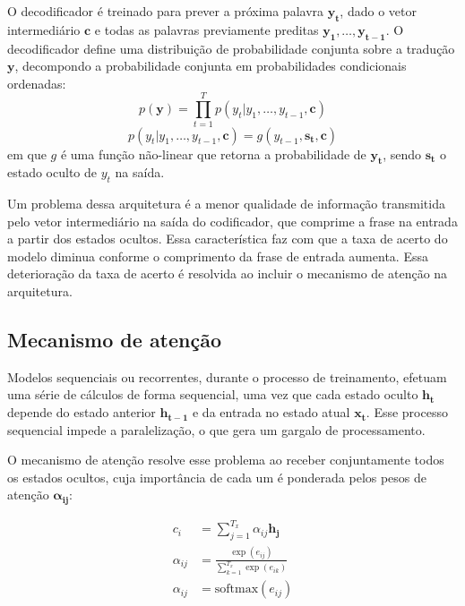 O decodificador é treinado para prever a próxima palavra $\mathbf{y_t}$, dado o
vetor intermediário $\mathbf{c}$ e todas as palavras previamente preditas
$\mathbf{y_1}, \ldots, \mathbf{y_{t-1}}$. O decodificador define uma
distribuição de probabilidade conjunta sobre a tradução $\mathbf{y}$, decompondo
a probabilidade conjunta em probabilidades condicionais ordenadas:
\begin{equation}
    p(\mathbf{y}) = \prod_{t=1}^T p(y_t | y_1, \ldots, y_{t-1}, \mathbf{c})
\end{equation}
\begin{equation}
    p(y_t | y_1, \ldots, y_{t-1}, \mathbf{c}) = g(y_{t-1}, \mathbf{s_t}, \mathbf{c})
\end{equation}
em que $g$ é uma função não-linear que retorna a probabilidade de
$\mathbf{y_t}$, sendo $\mathbf{s_t}$ o estado oculto de $y_t$ na saída.

Um problema dessa arquitetura é a menor qualidade de informação transmitida pelo
vetor intermediário na saída do codificador, que comprime a frase na entrada a
partir dos estados ocultos. Essa característica faz com que a taxa de acerto do
modelo diminua conforme o comprimento da frase de entrada aumenta. Essa
deterioração da taxa de acerto é resolvida ao incluir o mecanismo de atenção
na arquitetura.

\subsection{Mecanismo de atenção}
Modelos sequenciais ou recorrentes, durante o processo de treinamento, efetuam
uma série de cálculos de forma sequencial, uma vez que cada estado oculto
$\mathbf{h_t}$ depende do estado anterior $\mathbf{h_{t-1}}$ e da entrada no
estado atual $\mathbf{x_t}$. Esse processo sequencial impede a paralelização, o
que gera um gargalo de processamento.

O mecanismo de atenção \cite{bahdanau2016neural} resolve esse problema ao
receber conjuntamente todos os estados ocultos, cuja importância de cada um é
ponderada pelos pesos de atenção $\mathbf{\alpha_{ij}}$:


\begin{align}
    c_i &= \sum_{j=1}^{T_x} \alpha_{ij} \mathbf{h_j} \\
    \alpha_{ij} &= \frac{\exp(e_{ij})}{\sum_{k=1}^{T_x} \exp(e_{ik})} \\
    \alpha_{ij} &=  \text{softmax}(e_{ij})
\end{align}

